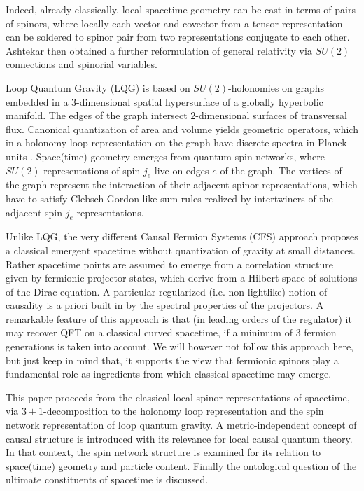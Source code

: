 \documentclass[11pt,a4paper]{article}
\theoremstyle{definition}
\begin{document}
	Indeed, already classically,  local spacetime geometry can be cast in terms of pairs of spinors\cite{penrose1984}, where locally each vector and covector from a tensor representation can be soldered to spinor pair from two representations conjugate to each other.   
	Ashtekar\cite{ashtekar1986,ashtekar1987} then obtained a further reformulation of general relativity via $SU(2)$ connections and spinorial variables.
	
	Loop Quantum Gravity (LQG) 
	is based on $SU(2)$-holonomies on graphs embedded in a $3$-dimensional spatial hypersurface of a globally hyperbolic manifold. The edges of the graph intersect $2$-dimensional surfaces of transversal flux. Canonical quantization of area and volume yields geometric operators, which in a holonomy loop representation on the graph  have discrete spectra in Planck units \cite{rovelli2004,thiemann2007}. Space(time) geometry emerges from quantum spin networks, where $SU(2)$-representations of spin $j_e$ live on edges $e$ of the graph. The vertices of the graph represent the interaction of their adjacent spinor representations, which have to satisfy Clebsch-Gordon-like sum rules realized by intertwiners of the adjacent
	spin $j_e$ representations.  
	
	Unlike LQG, the very different {Causal Fermion Systems} (CFS) approach \cite{finster2016,finster2020} proposes a classical emergent spacetime without quantization of gravity at small distances. Rather spacetime points are assumed to emerge from a correlation structure given by fermionic projector states, which derive from a Hilbert space of solutions of the Dirac equation. A particular regularized (i.e. non lightlike) notion of causality is a priori built in by the spectral properties of the projectors.
	A remarkable feature of this approach is that (in leading orders of the regulator) it may recover QFT on a classical curved spacetime, if a minimum of $3$ fermion generations is taken into account. We will however not follow this approach here, but just keep in mind that, it supports the view that fermionic spinors play a fundamental role as ingredients from which classical spacetime may emerge.
	
	This paper proceeds from the classical local spinor representations of spacetime, via $3+1$-decomposition to the holonomy loop representation and the spin network representation of loop quantum gravity.
	A metric-independent concept of causal structure is introduced with its relevance for local causal quantum theory. In that context, the spin network structure is examined for its relation to space(time) geometry and particle content.
	Finally the ontological question of the ultimate constituents of spacetime is discussed.
	
\end{document}
